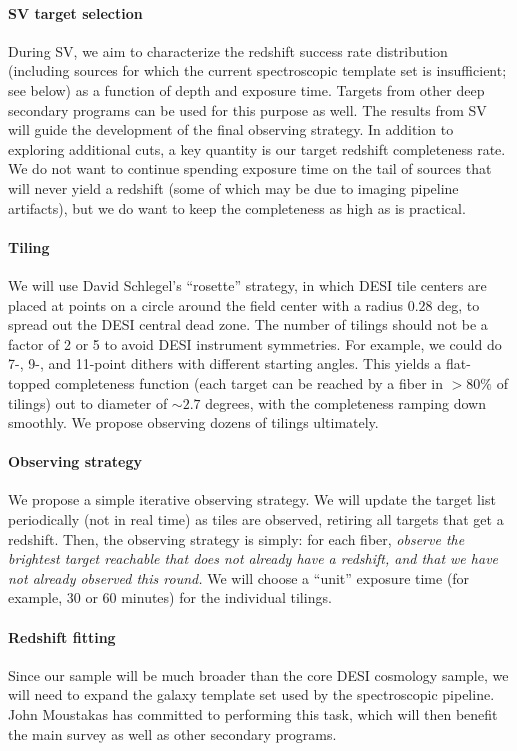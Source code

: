 \documentclass{aastex63}
\begin{document}
\paragraph{SV target selection}
During SV, we aim to characterize the redshift success rate
distribution (including sources for which the current spectroscopic
template set is insufficient; see below) as a function of depth and
exposure time.  Targets from other deep secondary programs can be used
for this purpose as well.  The results from SV will guide the
development of the final observing strategy.  In addition to exploring
additional cuts, a key quantity is our target redshift completeness
rate.  We do not want to continue spending exposure time on the tail
of sources that will never yield a redshift (some of which may be due
to imaging pipeline artifacts), but we do want to keep the
completeness as high as is practical.


\paragraph{Tiling} We will use David Schlegel's ``rosette'' strategy,
in which DESI tile centers are placed at points on a circle around the
field center with a radius $0.28$ deg, to spread out the DESI central
dead zone.  The number of tilings should not be a factor of 2 or 5 to
avoid DESI instrument symmetries.  For example, we could do 7-, 9-,
and 11-point dithers with different starting angles.  This yields a
flat-topped completeness function (each target can be reached by a
fiber in $> 80\%$ of tilings) out to diameter of $\sim 2.7$ degrees,
with the completeness ramping down smoothly.  We propose observing
dozens of tilings ultimately.

\paragraph{Observing strategy}  We propose a simple iterative observing
strategy.  We will update the target list periodically (not in real
time) as tiles are observed, retiring all targets that get a redshift.
Then, the observing strategy is simply: for each fiber, \emph{observe
  the brightest target reachable that does not already have a
  redshift, and that we have not already observed this round.}  We
will choose a ``unit'' exposure time (for example, 30 or 60 minutes)
for the individual tilings.

\paragraph{Redshift fitting}
Since our sample will be much broader than the core DESI cosmology
sample, we will need to expand the galaxy template set used by the
spectroscopic pipeline.  John Moustakas has committed to performing
this task, which will then benefit the main survey as well as other
secondary programs.



{}

\end{document}
